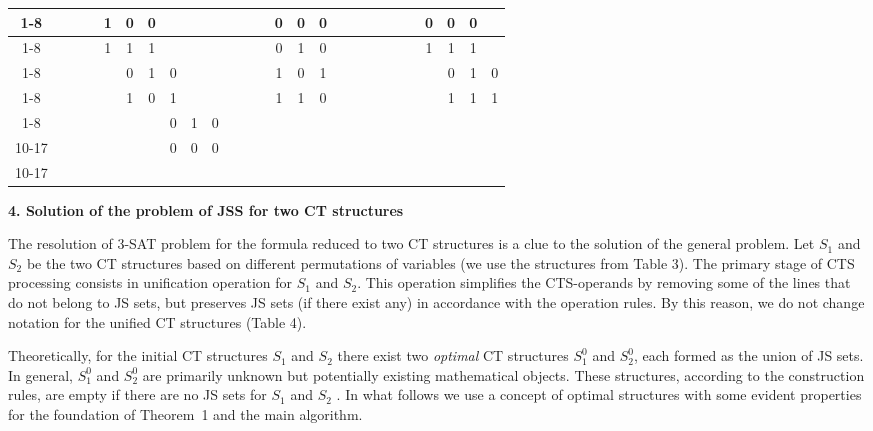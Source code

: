 \documentclass[12pt, a4paper]{article}
\begin{document}
\begin{table}[h]
\begin{tabular}{|c|c|c|c|c|c|c|c|c|c|c|c|c|c|c|c|c|c|c|c|c|c|c|c|c|c|}
\cline{1-8}                                                        \cline{10-17}
\cline{19-26}
&&&&1&0&0&&&&&&&0&0&0&&&&&&&0&0&0&\\
\cline{1-8}                                                        \cline{10-17}
\cline{19-26}
&&&&1&1&1&&&&&&&0&1&0&&&&&&&1&1&1&\\
\cline{1-8}                                                        \cline{10-17}
\cline{19-26}
&&&&&0&1&0&&&&&&1&0&1&&&&&&&&0&1&0\\
\cline{1-8}                                                        \cline{10-17}
\cline{19-26}
&&&&&1&0&1&&&&&&1&1&0&&&&&&&&1&1&1\\
\cline{1-8}
\cline{10-17}
\cline{19-26}
\multicolumn{8}{}{}&&&&&&&0&1&0\\

\cline{10-17}

\multicolumn{8}{}{}&&&&&&&0&0&0\\

\cline{10-17}

\end{tabular}
\end{table}

\medskip
\textbf {4. Solution of the problem of JSS for two CT structures}

\smallskip
The resolution of 3-SAT problem for the formula reduced to two CT structures is a clue to the solution of the general problem. Let  $S_1$  and  $S_2$  be the two CT structures based on different permutations of variables (we use the structures from Table 3). The primary stage of CTS processing consists in unification operation for $S_1$ and $S_2$. This operation simplifies the CTS-operands by removing some of the lines that do not belong to JS sets, but preserves JS sets (if there exist any) in accordance with the operation rules. By this reason, we do not change notation for the unified CT structures (Table 4).

Theoretically, for the initial CT structures  $S_1$  and  $S_2$  there exist two {\em optimal} CT structures  $S_1^0$  and  $S_2^0$, each formed as the union of JS sets. In general, $S_1^0$ and  $S_2^0$  are primarily unknown but potentially existing mathematical objects. These structures, according to the construction rules, are empty if there are no JS sets for $S_1$  and  $S_2$ . In what follows we use a concept of optimal structures with some evident properties for the foundation of Theorem~1 and the main algorithm.
\end{document}

